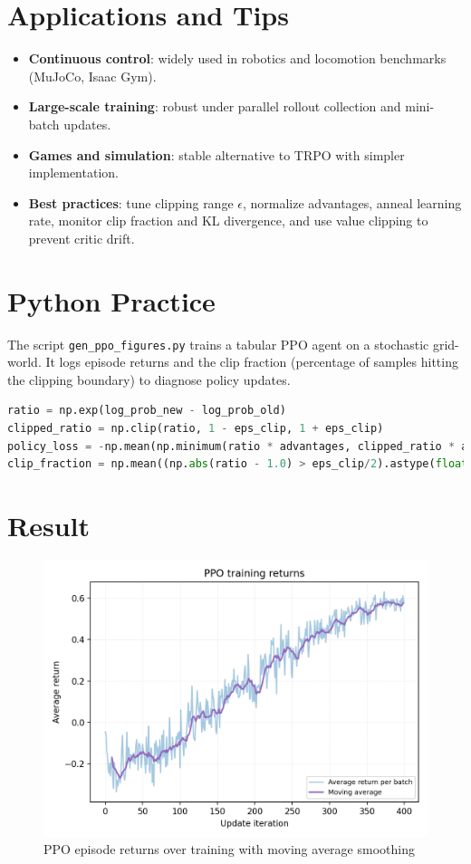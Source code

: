 ﻿\documentclass[12pt]{article}
\begin{document}
\section{Applications and Tips}
\begin{itemize}
  \item \textbf{Continuous control}: widely used in robotics and locomotion benchmarks (MuJoCo, Isaac Gym).
  \item \textbf{Large-scale training}: robust under parallel rollout collection and mini-batch updates.
  \item \textbf{Games and simulation}: stable alternative to TRPO with simpler implementation.
  \item \textbf{Best practices}: tune clipping range \(\epsilon\), normalize advantages, anneal learning rate, monitor clip fraction and KL divergence, and use value clipping to prevent critic drift.
\end{itemize}

\section{Python Practice}
The script \texttt{gen\_ppo\_figures.py} trains a tabular PPO agent on a stochastic grid-world. It logs episode returns and the clip fraction (percentage of samples hitting the clipping boundary) to diagnose policy updates.
\begin{lstlisting}[language=Python,caption={Excerpt from gen_ppo_figures.py}]
ratio = np.exp(log_prob_new - log_prob_old)
clipped_ratio = np.clip(ratio, 1 - eps_clip, 1 + eps_clip)
policy_loss = -np.mean(np.minimum(ratio * advantages, clipped_ratio * advantages))
clip_fraction = np.mean((np.abs(ratio - 1.0) > eps_clip/2).astype(float))
\end{lstlisting}

\section{Result}
\begin{figure}[H]
  \centering
  \includegraphics[width=0.8\linewidth]{ppo_returns.png}
  \caption{PPO episode returns over training with moving average smoothing}
  \label{fig:ppo_returns}
\end{figure}
\end{document}
